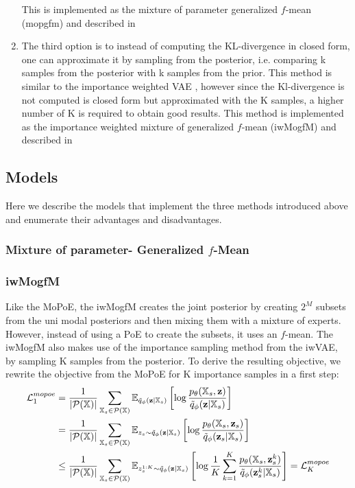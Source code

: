 \begin{enumerate}
    This is implemented as the mixture of parameter generalized $f$-mean (mopgfm) and described in %

    \item The third option is to instead of computing the KL-divergence in closed form, one can approximate it by sampling from the posterior, i.e. comparing k samples from the posterior with k samples from the prior.
    This method is similar to the importance weighted VAE \parencite[iwVAE]{burda_importance_2016}, however since the Kl-divergence is not computed is closed form but approximated with the K samples, a higher number of K is required to obtain good results.
    This method is implemented as the importance weighted mixture of generalized $f$-mean (iwMogfM) and described in %
\end{enumerate}

\subsection{Models}
Here we describe the models that implement the three methods introduced above and enumerate their advantages and disadvantages.

\subsubsection{Mixture of parameter- Generalized $f$-Mean}

\subsubsection{iwMogfM}
Like the MoPoE, the iwMogfM creates the joint posterior by creating $2^M$ subsets from the uni modal posteriors and then mixing them with a mixture of experts.
However, instead of using a PoE to create the subsets, it uses an $f$-mean.
The iwMogfM also makes use of the importance sampling method from the iwVAE, by sampling K samples from the posterior.
To derive the resulting objective, we rewrite the objective from the MoPoE for K importance samples in a first step:
\begin{equation}
    \begin{split}
        \mathcal{L}^{mopoe}_1&=\frac{1}{|\mathcal{P}(\mathbb{X})|} \sum _{\mathbb{X}_s \in \mathcal{P}(\mathbb{X})} \mathbb{E}_{\tilde{q}_{\phi}(\textbf{z}|\mathbb{X}_s)} \left[ \log \frac{p_{\theta}(\mathbb{X}_s, \textbf{z})}{\tilde{q}_{\phi}(\textbf{z}|\mathbb{X}_s)} \right]\\
        &=\frac{1}{|\mathcal{P}(\mathbb{X})|} \sum _{\mathbb{X}_s \in \mathcal{P}(\mathbb{X})} \mathbb{E}_{z_s \sim \tilde{q}_{\phi}(\textbf{z}|\mathbb{X}_s)} \left[ \log \frac{p_{\theta}(\mathbb{X}_s, \textbf{z}_s)}{\tilde{q}_{\phi}(\textbf{z}_s|\mathbb{X}_s)} \right]\\
        &\leq \frac{1}{|\mathcal{P}(\mathbb{X})|} \sum _{\mathbb{X}_s \in \mathcal{P}(\mathbb{X})} \mathbb{E}_{z^{1:K}_s \sim \tilde{q}_{\phi}(\textbf{z}|\mathbb{X}_s)} \left[ \log \frac{1}{K} \sum _{k=1}^K \frac{p_{\theta}(\mathbb{X}_s, \textbf{z}^k _s)}{\tilde{q}_{\phi}(\textbf{z}^k _s|\mathbb{X}_s)} \right] = \mathcal{L}^{mopoe}_K
    \end{split}
\end{equation}

